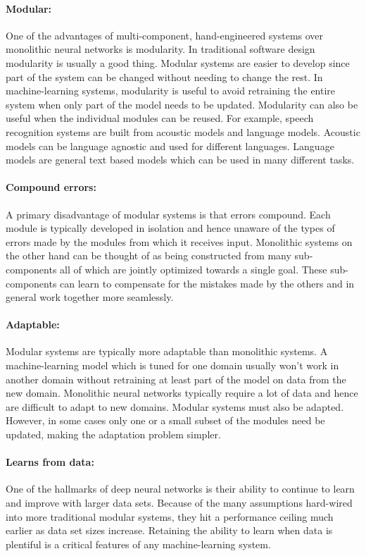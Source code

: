 \documentclass[main.tex]{subfiles}
\begin{document}
\paragraph{Modular:} One of the advantages of multi-component, hand-engineered
systems over monolithic neural networks is modularity. In traditional software
design modularity is usually a good thing. Modular systems are easier to
develop since part of the system can be changed without needing to change the
rest. In machine-learning systems, modularity is useful to avoid retraining the
entire system when only part of the model needs to be updated. Modularity can
also be useful when the individual modules can be reused. For example, speech
recognition systems are built from acoustic models and language models.
Acoustic models can be language agnostic and used for different languages.
Language models are general text based models which can be used in many
different tasks.

\paragraph{Compound errors:} A primary disadvantage of modular systems is that
errors compound. Each module is typically developed in isolation and hence
unaware of the types of errors made by the modules from which it receives
input. Monolithic systems on the other hand can be thought of as being
constructed from many sub-components all of which are jointly optimized towards
a single goal. These sub-components can learn to compensate for the mistakes
made by the others and in general work together more seamlessly.

\paragraph{Adaptable:} Modular systems are typically more adaptable than
monolithic systems. A machine-learning model which is tuned for one domain
usually won't work in another domain without retraining at least part of the
model on data from the new domain. Monolithic neural networks typically require
a lot of data and hence are difficult to adapt to new domains. Modular systems
must also be adapted. However, in some cases only one or a small subset of the
modules need be updated, making the adaptation problem simpler.

\paragraph{Learns from data:} One of the hallmarks of deep neural networks is
their ability to continue to learn and improve with larger data sets. Because
of the many assumptions hard-wired into more traditional modular systems, they
hit a performance ceiling much earlier as data set sizes increase. Retaining
the ability to learn when data is plentiful is a critical features of any
machine-learning system.
\end{document}
